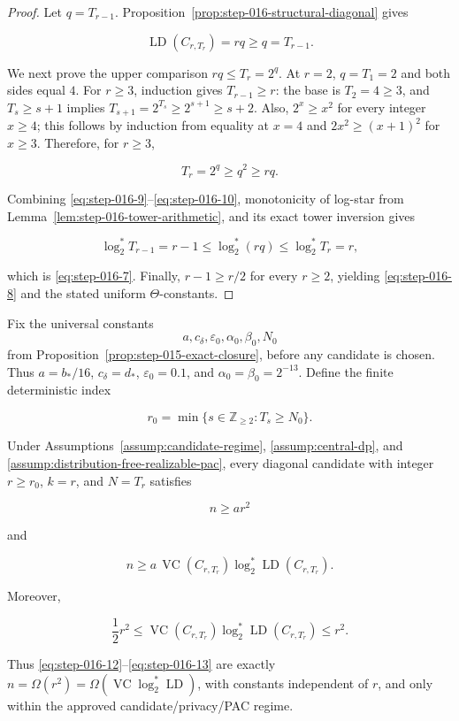 \begin{proof}
Let \(q=T_{r-1}\). Proposition~\ref{prop:step-016-structural-diagonal}
gives

\[
\operatorname{LD}(C_{r,T_r})=rq\ge q=T_{r-1}.
\tag{S16.9}\label{eq:step-016-9}
\]

We next prove the upper comparison \(rq\le T_r=2^q\). At \(r=2\),
\(q=T_1=2\) and both sides equal \(4\). For \(r\ge3\), induction gives
\(T_{r-1}\ge r\): the base is \(T_2=4\ge3\), and
\(T_s\ge s+1\) implies \(T_{s+1}=2^{T_s}\ge2^{s+1}\ge s+2\).
Also, \(2^x\ge x^2\) for every integer \(x\ge4\); this follows by
induction from equality at \(x=4\) and
\(2x^2\ge(x+1)^2\) for \(x\ge3\). Therefore, for \(r\ge3\),

\[
T_r=2^q\ge q^2\ge rq.
\tag{S16.10}\label{eq:step-016-10}
\]

Combining \eqref{eq:step-016-9}--\eqref{eq:step-016-10}, monotonicity of log-star from
Lemma~\ref{lem:step-016-tower-arithmetic}, and its exact tower inversion
gives

\[
\log_2^*T_{r-1}=r-1
\le\log_2^*(rq)
\le\log_2^*T_r=r,
\]

which is \eqref{eq:step-016-7}. Finally, \(r-1\ge r/2\) for every \(r\ge2\), yielding
\eqref{eq:step-016-8} and the stated uniform \(\Theta\)-constants. \end{proof}

\begin{proposition}\label{prop:step-016-rate-bridge}
Fix the universal constants
\[
a,c_\delta,\varepsilon_0,\alpha_0,\beta_0,N_0
\]
from Proposition~\ref{prop:step-015-exact-closure}, before any candidate is
chosen. Thus \(a=b_*/16\), \(c_\delta=d_*\), \(\varepsilon_0=0.1\), and
\(\alpha_0=\beta_0=2^{-13}\). Define
the finite deterministic index

\[
r_0=\min\{s\in\mathbb Z_{\ge2}:T_s\ge N_0\}.
\tag{S16.11}\label{eq:step-016-11}
\]

Under Assumptions~\ref{assump:candidate-regime},
\ref{assump:central-dp}, and
\ref{assump:distribution-free-realizable-pac}, every diagonal candidate
with integer \(r\ge r_0\), \(k=r\), and \(N=T_r\) satisfies

\[
n\ge ar^2
\tag{S16.12}\label{eq:step-016-12}
\]

and

\[
n\ge
a\,\operatorname{VC}(C_{r,T_r})
   \log_2^*\operatorname{LD}(C_{r,T_r}).
\tag{S16.13}\label{eq:step-016-13}
\]

Moreover,

\[
\frac12r^2
\le
\operatorname{VC}(C_{r,T_r})
\log_2^*\operatorname{LD}(C_{r,T_r})
\le r^2.
\tag{S16.14}\label{eq:step-016-14}
\]

Thus \eqref{eq:step-016-12}--\eqref{eq:step-016-13} are exactly
\(n=\Omega(r^2)=\Omega(\operatorname{VC}\log_2^*\operatorname{LD})\),
with constants independent of \(r\), and only within the approved
candidate/privacy/PAC regime.
\end{proposition}

